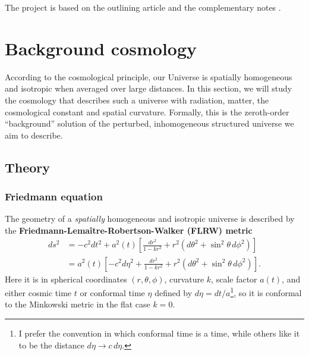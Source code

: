 \documentclass[10pt,a4paper]{article}
\begin{document}
The project is based on the outlining article \cite{callinHowCalculateCMB2006}
and the complementary notes \cite{wintherCosmologyIINumerical}.

\clearpage

\section{Background cosmology}
\label{sec_background_cosmology}

According to the cosmological principle,
our Universe is spatially homogeneous and isotropic when averaged over large distances.
In this section, we will study the cosmology that describes such a universe
with radiation, matter, the cosmological constant and spatial curvature.
Formally, this is the zeroth-order ``background'' solution of the perturbed, inhomogeneous structured universe we aim to describe.

\subsection{Theory}
\label{sec_background_cosmology_theory}

\subsubsection*{Friedmann equation}

The geometry of a \emph{spatially} homogeneous and isotropic universe
is described by the \textbf{Friedmann-Lemaître-Robertson-Walker (FLRW) metric}
\begin{equation}
\begin{split}
	ds^2 &= -c^2 dt^2 + a^2(t) \left[\frac{dr^2}{1 - kr^2} + r^2\left(d\theta^2 + \sin^2\theta \, d\phi^2\right) \right] \\
	     &= a^2(t) \left[-c^2 d\eta^2 + \frac{dr^2}{1 - kr^2} + r^2\left(d\theta^2 + \sin^2\theta \, d\phi^2\right) \right].
\end{split}
\label{eq_flrw}
\end{equation}
Here it is in spherical coordinates $(r,\theta,\phi)$, curvature $k$, scale factor $a(t)$,
and either cosmic time $t$ or conformal time $\eta$ defined by $d\eta = dt/a$\footnote{I prefer the convention in which conformal time is a time, while others like it to be the distance $d\eta \rightarrow c \, d\eta$.},
so it is conformal to the Minkowski metric in the flat case $k=0$.
\end{document}
